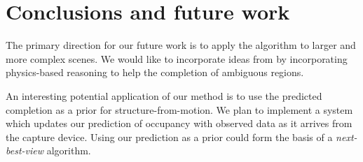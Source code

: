 \documentclass[10pt,twocolumn,letterpaper]{article}
\newcommand{\todo}[1]{\textcolor{red}{TODO: #1}}
\begin{document}

\section{Conclusions and future work}


The primary direction for our future work is to apply the algorithm to larger and more complex scenes.
We would like to incorporate ideas from \cite{zheng-cvpr-2013, shao-siggraphasia-2014} by incorporating physics-based reasoning to help the completion of ambiguous regions.

An interesting potential application of our method is to use the predicted completion as a prior for structure-from-motion.
We plan to implement a system which updates our prediction of occupancy with observed data as it arrives from the capture device.
Using our prediction as a prior could form the basis of a \emph{next-best-view} algorithm.


{\small


}

\end{document}
